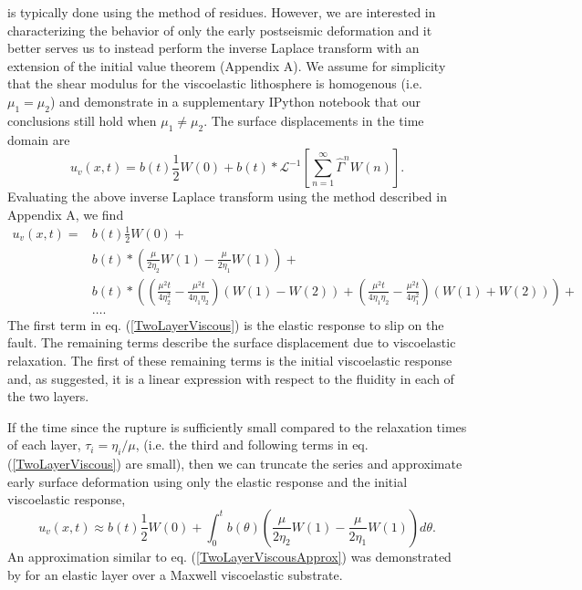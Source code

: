 \documentclass[extra]{gji}
\begin{document}
is typically done using the method of residues. However, we are interested in characterizing
the behavior of only the early postseismic deformation and it better serves us
to instead perform the inverse Laplace transform with an extension of
the initial value theorem (Appendix A). We assume for simplicity that
the shear modulus for the viscoelastic lithosphere is homogenous
(i.e. $\mu_1 = \mu_2$) and demonstrate in a supplementary IPython
notebook that our conclusions still hold when $\mu_1 \neq \mu_2$.  The
surface displacements in the time domain are
\begin{equation}
 u_v(x,t) = b(t)\frac{1}{2}W(0) + 
            b(t)\ast\mathcal{L}^{-1}\left[\sum_{n=1}^\infty\hat{\Gamma}^{n}W(n)\right].
\end{equation}
Evaluating the above inverse Laplace transform using the method
described in Appendix A, we find 
\begin{align}\label{TwoLayerViscous}
  u_v(x,t) = &b(t)\frac{1}{2}W(0) +\nonumber\\
             &b(t)\ast\left(\frac{\mu}{2\eta_2}W(1) - \frac{\mu}{2\eta_1}W(1)\right) +\nonumber\\
             &b(t)\ast\left(\left(\frac{\mu^2t}{4\eta_2^2} -
                  \frac{\mu^2t}{4\eta_1\eta_2}\right) \left(W(1) - W(2)\right) +
                  \left(\frac{\mu^2t}{4\eta_1\eta_2} - \frac{\mu^2t}{4\eta_1^2}\right)
                  \left(W(1) + W(2)\right)\right) + \nonumber\\ 
             &\dots.
\end{align}
The first term in eq. (\ref{TwoLayerViscous}) is the elastic response
to slip on the fault.  The remaining terms describe the surface
displacement due to viscoelastic relaxation.  The first of these
remaining terms is the initial viscoelastic response and, as
suggested, it is a linear expression with respect to the fluidity in
each of the two layers.

If the time since the rupture is sufficiently small compared to the
relaxation times of each layer, $\tau_i=\eta_i/\mu$, (i.e. the third
and following terms in eq. (\ref{TwoLayerViscous}) are small), then we
can truncate the series and approximate early surface deformation
using only the elastic response and the initial viscoelastic response,
\begin{equation}\label{TwoLayerViscousApprox}
 u_v(x,t) \approx b(t)\frac{1}{2}W(0) + 
          \int_0^t b(\theta)\left(\frac{\mu}{2\eta_2}W(1) - 
                  \frac{\mu}{2\eta_1}W(1)\right)d\theta.
\end{equation} 
An approximation similar to eq. (\ref{TwoLayerViscousApprox}) was
demonstrated by \citet{S2010} for an elastic layer over a Maxwell
viscoelastic substrate.  
\end{document}
